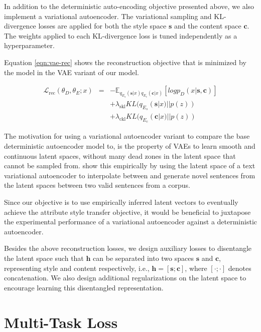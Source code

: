 In addition to the deterministic auto-encoding objective presented above, we also implement a variational autoencoder. The variational sampling and KL-divergence losses are applied for both the style space $\bm s$ and the content space $\bm c$. The weights applied to each KL-divergence loss is tuned independently as a hyperparameter.

Equation \ref{eqn:vae-rec} shows the reconstruction objective that is minimized by the model in the VAE variant of our model.

\begin{eqnarray} \label{eqn:vae-rec}
	\mathcal{L}_\text{rec}(\theta_D, \theta_E; x) &=& \nonumber
	- \mathbb{E}_{q_{E_s}(\bm s|x) q_{E_c}(\bm c|x)} [log p_D(x|\bm s, \bm c)] \nonumber \\ & &
	+ \lambda_{\text{skl}} KL(q_{E_s}(\bm s|x)||p(z)) \nonumber \\ & &
	+ \lambda_{\text{ckl}} KL(q_{E_c}(\bm c|x)||p(z))
\end{eqnarray}

The motivation for using a variational autoencoder variant to compare the base deterministic autoencoder model to, is the property of VAEs to learn smooth and continuous latent spaces, without many dead zones in the latent space that cannot be sampled from. \cite{bowman2016generating} show this empirically by using the latent space of a text variational autoencoder to interpolate between and generate novel sentences from the latent spaces between two valid sentences from a corpus.

Since our objective is to use empirically inferred latent vectors to eventually achieve the attribute style transfer objective, it would be beneficial to juxtapose the experimental performance of a variational autoencoder against a deterministic autoencoder.


Besides the above reconstruction losses, we design auxiliary losses to disentangle the latent space such that $\bm h$ can be separated into two spaces $\bm s$ and $\bm c$, representing style and content respectively, i.e., $\bm h = [\bm s ; \bm c]$, where $[\cdot;\cdot]$ denotes concatenation. We also design additional regularizations on the latent space to encourage learning this disentangled representation.


\section{Multi-Task Loss} \label{ssec:multitask-objective}

